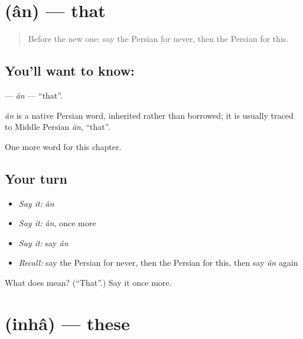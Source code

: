 \section[\texorpdfstring{\fa{آن} (ân)}{آن (ân)}]{ (ân) — that}

\label{lesson:FA-C82-an}



\begin{quote}
Before the new one: say the Persian for never, then the Persian for this.
\end{quote}

\subsection*{You'll want to know: }
\textbf{} — \emph{ân} — \textquotedblleft{}that\textquotedblright{}.

\begin{cousinweb}
\emph{ân} is a native Persian word, inherited rather than borrowed; it is usually traced to Middle Persian \emph{ān}, \textquotedblleft{}that\textquotedblright{}.
\end{cousinweb}

\begin{grammarlens}[title={What you've built}]
One more word for this chapter.
\end{grammarlens}

\subsection*{Your turn}
\begin{itemize}
\raggedright
  \item \emph{Say it:} \emph{ân}
  \item \emph{Say it:} \emph{ân}, once more
  \item \emph{Say it:} say \emph{ân}
  \item \emph{Recall:} say the Persian for never, then the Persian for this, then say \emph{ân} again
\end{itemize}

\begin{tcolorbox}[breakable,colback=teal!4,colframe=teal!35!black,title={Before you move on}]
What does  mean? (\textquotedblleft{}That\textquotedblright{}.) Say it once more.
\end{tcolorbox}
\section[\texorpdfstring{\fa{اینها} (inhâ)}{اینها (inhâ)}]{ (inhâ) — these}

